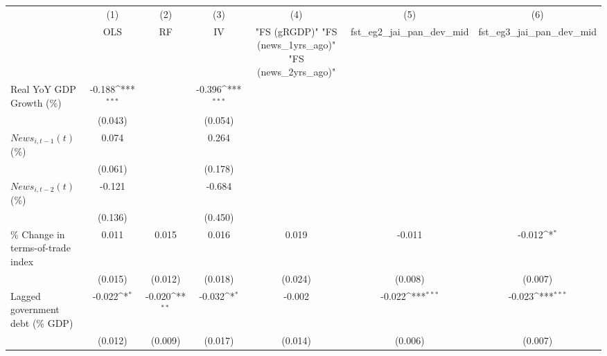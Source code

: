 {
\def\sym#1{\ifmmode^{#1}\else\(^{#1}\)\fi}
\begin{tabular}{l*{6}{c}}
\toprule
                    &\multicolumn{1}{c}{(1)}&\multicolumn{1}{c}{(2)}&\multicolumn{1}{c}{(3)}&\multicolumn{1}{c}{(4)}&\multicolumn{1}{c}{(5)}&\multicolumn{1}{c}{(6)}\\
                    &\multicolumn{1}{c}{OLS}&\multicolumn{1}{c}{RF}&\multicolumn{1}{c}{IV}&\multicolumn{1}{c}{ "FS (gRGDP)"  "FS (news_1yrs_ago)"  "FS (news_2yrs_ago)" }&\multicolumn{1}{c}{fst_eg2_jai_pan_dev_mid}&\multicolumn{1}{c}{fst_eg3_jai_pan_dev_mid}\\
\midrule
Real YoY GDP Growth (\%)&      -0.188\sym{***}&                     &      -0.396\sym{***}&                     &                     &                     \\
                    &     (0.043)         &                     &     (0.054)         &                     &                     &                     \\
\addlinespace
$ News_{i,t-1}(t)$ (\%)&       0.074         &                     &       0.264         &                     &                     &                     \\
                    &     (0.061)         &                     &     (0.178)         &                     &                     &                     \\
\addlinespace
$ News_{i,t-2}(t)$ (\%)&      -0.121         &                     &      -0.684         &                     &                     &                     \\
                    &     (0.136)         &                     &     (0.450)         &                     &                     &                     \\
\addlinespace
\% Change in terms-of-trade index&       0.011         &       0.015         &       0.016         &       0.019         &      -0.011         &      -0.012\sym{*}  \\
                    &     (0.015)         &     (0.012)         &     (0.018)         &     (0.024)         &     (0.008)         &     (0.007)         \\
\addlinespace
Lagged government debt (\% GDP)&      -0.022\sym{*}  &      -0.020\sym{**} &      -0.032\sym{*}  &      -0.002         &      -0.022\sym{***}&      -0.023\sym{***}\\
                    &     (0.012)         &     (0.009)         &     (0.017)         &     (0.014)         &     (0.006)         &     (0.007)         \\

\end{tabular}}
